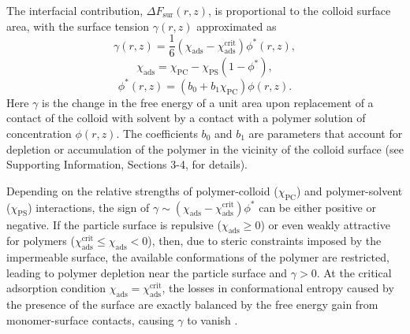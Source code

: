 \documentclass[12pt, a4paper]{article}
\begin{document}
The interfacial contribution, $\Delta F_{\text{sur}}(r,z)$, is proportional to the colloid surface area, with the surface tension $\gamma (r,z)$ approximated as
\begin{equation}
    \gamma (r,z)= \frac{1}{6}(\chi_{\text{ads}} - \chi_{\text{ads}}^{\text{crit}})\phi^{\ast}(r,z),
    \label{eq:chi_ads} 
\end{equation}
$$
\chi_{\text{ads}} = \chi_{\text{PC}} - \chi_{\text{PS}}(1-\phi^{\ast}),
$$
$$
\phi^{\ast}(r,z)= (b_{0} + b_{1}\chi_{\text{PC}})\phi(r,z).
$$
Here $\gamma$ is the change in the free energy of a unit area upon replacement of a contact of the colloid with solvent by a contact with a polymer solution of concentration $\phi(r,z)$.
The coefficients $b_0$ and $b_1$ are parameters that account for depletion or accumulation of the polymer in the vicinity of the colloid surface (see Supporting Information, Sections 3-4, for details).

Depending on the relative strengths of polymer-colloid ($\chi_{\text{PC}}$) and polymer-solvent ($\chi_{\text{PS}}$) interactions, the sign of $\gamma \sim (\chi_{\text{ads}} - \chi_{\text{ads}}^{\text{crit}}) \phi^{\ast}$ can be either positive or negative.
If the particle surface is repulsive ($\chi_{\text{ads}} \geq 0$) or even weakly attractive for polymers ($\chi_{\text{ads}}^{\text{crit}} \leq \chi_{\text{ads}} < 0$), then, due to steric constraints imposed by the impermeable surface, the available conformations of the polymer are restricted, leading to polymer depletion near the particle surface and $\gamma > 0$.
At the critical adsorption condition $\chi_{\text{ads}} = \chi_{\text{ads}}^{\text{crit}}$, the losses in conformational entropy caused by the presence of the surface are exactly balanced by the free energy gain from monomer-surface contacts, causing $\gamma$ to vanish \cite{Fleer1993,Birshtein1979,Birshtein1983,Eisenriegler1982}.

\end{document}
